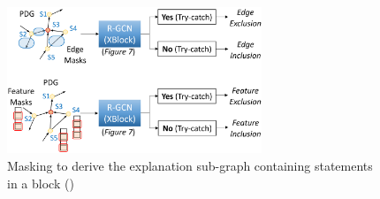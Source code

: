 
\begin{figure}[t]
	\centering
	\includegraphics[width=3in]{XAI.png}
        \vspace{-0.06in}
	\caption{Masking to derive the explanation sub-graph containing statements in a  block ({\xstate})}
        \vspace{-0.06in}
	\label{fig:GNNEX}	
\end{figure}




